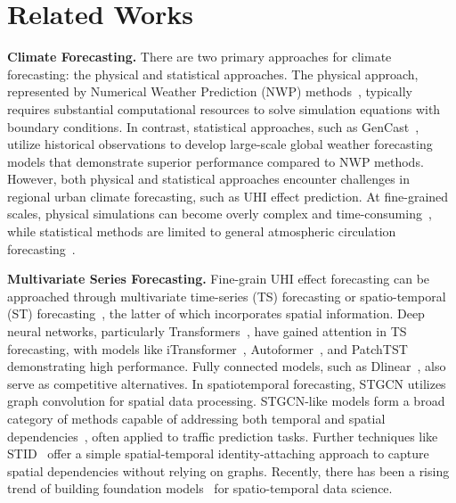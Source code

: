 
\section{Related Works}
\label{sec:relate}
\textbf{Climate Forecasting.} There are two primary approaches for climate forecasting: the physical and statistical approaches. The physical approach, represented by Numerical Weather Prediction (NWP) methods~\cite{bauer2015quiet}, typically requires substantial computational resources to solve simulation equations with boundary conditions. In contrast, statistical approaches, such as GenCast~\cite{price2023gencast}, utilize historical observations to develop large-scale global weather forecasting models that demonstrate superior performance compared to NWP methods. However, both physical and statistical approaches encounter challenges in regional urban climate forecasting, such as UHI effect prediction. At fine-grained scales, physical simulations can become overly complex and time-consuming~\cite{mass1998regional}, while statistical methods are limited to general atmospheric circulation forecasting~\cite{schultz2021can}.


\noindent
\textbf{Multivariate Series Forecasting.} Fine-grain UHI effect forecasting can be approached through multivariate time-series (TS) forecasting or spatio-temporal (ST) forecasting~\cite{shao2024exploring,liu2022contrastive}, the latter of which incorporates spatial information. Deep neural networks, particularly Transformers~\cite{wen2022transformers}, have gained attention in TS forecasting, with models like iTransformer~\cite{liu2023itransformer}, Autoformer~\cite{wu2021autoformer}, and PatchTST~\cite{nie2022time} demonstrating high performance. Fully connected models, such as Dlinear~\cite{zeng2023transformers}, also serve as competitive alternatives.
In spatiotemporal forecasting, STGCN utilizes graph convolution for spatial data processing. STGCN-like models form a broad category of methods capable of addressing both temporal and spatial dependencies~\cite{shao2024exploring,yu2017spatio}, often applied to traffic prediction tasks. Further techniques like STID~\cite{shao2022spatial} offer a simple spatial-temporal identity-attaching approach to capture spatial dependencies without relying on graphs. Recently, there has been a rising trend of building foundation models~\cite{liang2025foundation} for spatio-temporal data science.



